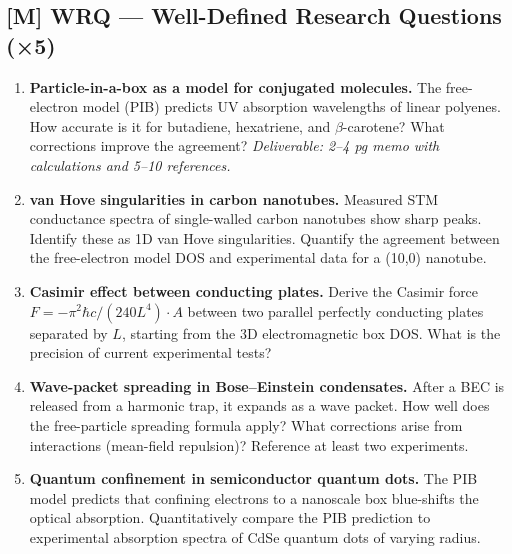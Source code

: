 \subsection*{[M] WRQ — Well-Defined Research Questions (×5)}
\begin{tcolorbox}[researchbox, title={WRQ · L01 · Tiers 4–5 · 5–10 hrs each}]
\begin{enumerate}[label=\textbf{R\arabic*.}]
  \item \textbf{Particle-in-a-box as a model for conjugated molecules.}
    The free-electron model (PIB) predicts UV absorption wavelengths of linear polyenes.
    How accurate is it for butadiene, hexatriene, and $\beta$-carotene? What corrections
    improve the agreement? \textit{Deliverable: 2–4 pg memo with calculations and 5–10 references.}
  \item \textbf{van Hove singularities in carbon nanotubes.}
    Measured STM conductance spectra of single-walled carbon nanotubes show sharp peaks.
    Identify these as 1D van Hove singularities. Quantify the agreement between the free-electron
    model DOS and experimental data for a (10,0) nanotube.
  \item \textbf{Casimir effect between conducting plates.}
    Derive the Casimir force $F = -\pi^2\hbar c/(240 L^4) \cdot A$ between two parallel
    perfectly conducting plates separated by $L$, starting from the 3D electromagnetic
    box DOS. What is the precision of current experimental tests?
  \item \textbf{Wave-packet spreading in Bose–Einstein condensates.}
    After a BEC is released from a harmonic trap, it expands as a wave packet.
    How well does the free-particle spreading formula apply? What corrections arise from
    interactions (mean-field repulsion)? Reference at least two experiments.
  \item \textbf{Quantum confinement in semiconductor quantum dots.}
    The PIB model predicts that confining electrons to a nanoscale box blue-shifts the
    optical absorption. Quantitatively compare the PIB prediction to experimental absorption
    spectra of CdSe quantum dots of varying radius.
\end{enumerate}
\end{tcolorbox}

